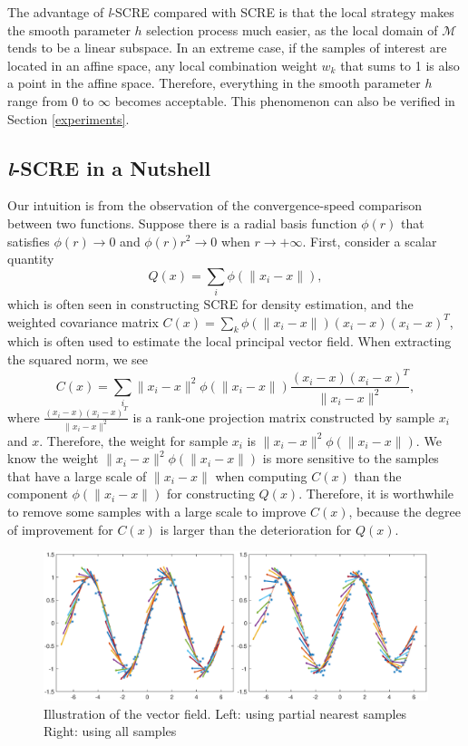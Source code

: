 \documentclass[aos,preprint]{imsart}
\theoremstyle{remark}
\begin{document}
The advantage of {\it l}-SCRE compared with SCRE is that the local strategy makes the smooth parameter $h$ selection process much easier, as the local domain of $\mathcal M$ tends to be a linear subspace. In an extreme case, if the samples of interest are located in an affine space, any local combination weight $w_k $ that sums to 1 is also a point in the affine space. Therefore, everything in the smooth parameter $h$ range from $0$ to $\infty$ becomes acceptable. This phenomenon can also be verified in Section \ref{experiments}.

\subsection{{\it l}-SCRE in a Nutshell}
Our intuition is from the observation of the convergence-speed comparison between two functions. Suppose there is a radial basis function $\phi(r)$ that satisfies $\phi(r)\rightarrow 0$ and $\phi(r)r^2\rightarrow 0$ when $ r \rightarrow +\infty$. First, consider a scalar quantity 
\[
 Q(x) = \sum_i \phi(\|x_i-x\|),
\]
which is often seen in constructing SCRE for density estimation, and the weighted covariance matrix $C(x) = \sum_k \phi(\|x_i-x\|)(x_i-x)(x_i-x)^T$, which is often used to estimate the local principal vector field. When extracting the squared norm, we see
\[
  C(x) = \sum_i \|x_i-x\|^2\phi(\|x_i-x\|)\frac{(x_i-x)(x_i-x)^T}{\|x_i-x\|^2} ,
\]
where $\frac{(x_i-x)(x_i-x)^T}{\|x_i-x\|^2}$ is a rank-one projection matrix constructed by sample $x_i$ and $x$. Therefore, the weight for sample $x_i$ is $\|x_i-x\|^2\phi(\|x_i-x\|)$.
We know the weight $\|x_i-x\|^2\phi(\|x_i-x\|)$ is more sensitive to the samples that have a large scale of $\|x_i-x\|$ when computing $C(x)$ than the component $\phi(\|x_i-x\|)$ for constructing $Q(x)$. Therefore, it is worthwhile to remove some samples with a large scale to improve $C(x)$, because the degree of improvement for $C(x)$ is larger than the deterioration for $Q(x)$. %

\begin{figure}[h] %
   \centering
   \includegraphics[width=\linewidth]{field_demo.eps} 
   \caption{Illustration of the vector field. Left: using partial nearest samples Right: using all samples}
   \label{fig:example}
\end{figure}
\end{document}
